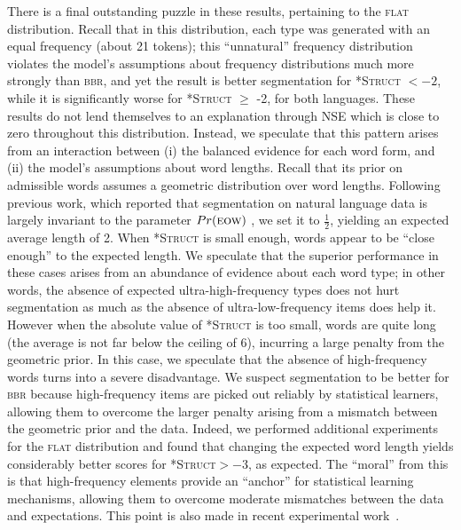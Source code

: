 \documentclass[11pt]{article}
\begin{document}
There is a final outstanding puzzle in these results, pertaining to the \textsc{flat} distribution. Recall that in this distribution, each type was generated with an equal frequency (about 21 tokens); this ``unnatural'' frequency distribution violates the model's assumptions about frequency distributions much more strongly than \textsc{bbr}, and yet the result is better segmentation for \textsc{*Struct} $< -2$, while it is significantly worse for \textsc{*Struct} $\geq$ -2, for both languages. These results do not lend themselves to an explanation through NSE which is close to zero throughout this distribution. Instead, we speculate that this pattern arises from an interaction between (i) the balanced evidence for each word form, and (ii) the model's assumptions about word lengths. Recall that its prior on admissible words assumes a geometric distribution over word lengths. Following previous work, which reported that segmentation on natural language data is largely invariant to the parameter $Pr(\textsc{eow})$ \cite{Goldwater09a}, we set it to $\frac{1}{2}$, yielding an expected average length of 2. When \textsc{*Struct} is small enough, words appear to be ``close enough'' to the expected length. We speculate that the superior performance in these cases arises from an abundance of evidence about each word type; in other words, the absence of expected ultra-high-frequency types does not hurt segmentation as much as the absence of ultra-low-frequency items does help it. However when the absolute value of \textsc{*Struct} is too small, words are quite long (the average is not far below the ceiling of 6), incurring a large penalty from the geometric prior. In this case, we speculate that the absence of high-frequency words turns into a severe disadvantage. We suspect segmentation to be better for \textsc{bbr} because high-frequency items are picked out reliably by statistical learners, allowing them to overcome the larger penalty arising from a mismatch between the geometric prior and the data. Indeed, we performed additional experiments for the \textsc{flat} distribution and found that changing the expected word length yields considerably better scores for \textsc{*Struct}$> -3$, as expected.%
 The ``moral'' from this is that high-frequency elements provide an ``anchor'' for statistical learning mechanisms, allowing them to overcome moderate mismatches between the data and expectations. This point is also made in recent experimental work~\cite{Kurumada13a}.
\end{document}
